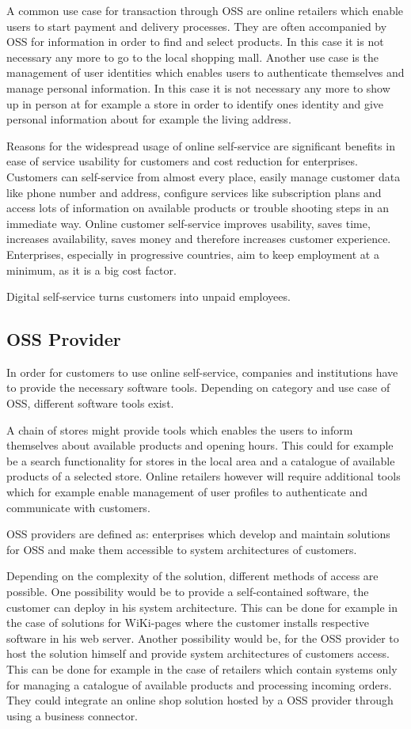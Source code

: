 \documentclass[
     12pt,         %
     a4paper,      %
     BCOR=10mm,version=first,     %
     DIV=14,version=first,        %
     ]{scrreprt}
\begin{document}
A common use case for transaction through OSS are online retailers which enable users to start payment and delivery processes. They are often accompanied by OSS for information in order to find and select products. In this case it is not necessary any more to go to the local shopping mall.
Another use case is the management of user identities which enables users to authenticate themselves and manage personal information. In this case it is not necessary any more to show up in person at for example a store in order to identify ones identity and give personal information about for example the living address.

Reasons for the widespread usage of online self-service are significant benefits in ease of service usability for customers and cost reduction for enterprises. Customers can self-service from almost every place, easily manage customer data like phone number and address, configure services like subscription plans and access lots of information on available products or trouble shooting steps in an immediate way. Online customer self-service improves usability, saves time, increases availability, saves money and therefore increases customer experience. Enterprises, especially in progressive countries, aim to keep employment at a minimum, as it is a big cost factor.

Digital self-service turns customers into unpaid employees.

\subsection{OSS Provider}
In order for customers to use online self-service, companies and institutions have to provide the necessary software tools. Depending on category and use case of OSS, different software tools exist.

A chain of stores might provide tools which enables the users to inform themselves about available products and opening hours. This could for example be a search functionality for stores in the local area and a catalogue of available products of a selected store. Online retailers however will require additional tools which for example enable management of user profiles to authenticate and communicate with customers.

OSS providers are defined as: enterprises which develop and maintain solutions for OSS and make them accessible to system architectures of customers. 

Depending on the complexity of the solution, different methods of access are possible. One possibility would be to provide a self-contained software, the customer can deploy in his system architecture. This can be done for example in the case of solutions for WiKi-pages where the customer installs respective software in his web server. Another possibility would be, for the OSS provider to host the solution himself and provide system architectures of customers access. This can be done for example in the case of retailers which contain systems only for managing a catalogue of available products and processing incoming orders. They could integrate an online shop solution hosted by a OSS provider through using a business connector.
\end{document}
